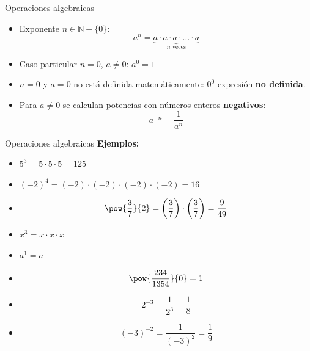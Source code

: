 \documentclass[9pt, aspectratio=169]{beamer}
\begin{document}
\begin{frame}{Operaciones algebraicas}
    \begin{definition}[Potenciación]
        \begin{itemize}
            \item Exponente $n \in \mathbb{N} - \{0\}$:
                \[ a^n = \underbrace{a \cdot a \cdot a \cdot \ldots \cdot a}_{n \text{ veces}} \]
            \item Caso particular $n = 0$, $a \neq 0$: $a^0 = 1$
            \item $n = 0$ y $a = 0$ \alert{no está definida matemáticamente}: $0^0$ expresión \textbf{no definida}.
            \item Para $a \neq 0$ se calculan potencias con números enteros \textbf{negativos}:
                \[ a^{-n} = \frac{1}{a^n} \]
        \end{itemize}
    \end{definition}

\end{frame}

\begin{frame}{Operaciones algebraicas}
    \textbf{Ejemplos:}
\begin{multicols}{2}
\begin{itemize}
\item $5^3 = 5 \cdot 5 \cdot 5 = 125$
\item $(-2)^4 = (-2) \cdot (-2) \cdot (-2) \cdot (-2) = 16$
\item \[\pow{\frac{3}{7}}{2} = \left(\frac{3}{7}\right) \cdot \left(\frac{3}{7}\right) = \frac{9}{49} \]
\item $x^3 = x \cdot x \cdot x$
\item $a^1 = a$
\item \[ \pow{\frac{234}{1354}}{0} = 1 \]
\item \[ 2^{-3} = \frac{1}{2^3} = \frac{1}{8} \]
\item \[ (-3)^{-2} = \frac{1}{(-3)^2} = \frac{1}{9} \] 
\end{itemize}
\end{multicols}
\end{frame}
\end{document}
